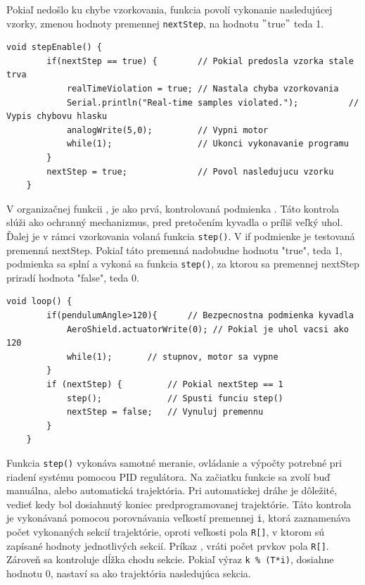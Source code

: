 Pokiaľ nedošlo ku chybe vzorkovania, funkcia povolí vykonanie nasledujúcej vzorky, zmenou hodnoty premennej \verb|nextStep|, na hodnotu $"$true$"$ teda 1. 

\begin{lstlisting}[caption={Funkcia stepEnable().},captionpos=b]
	void stepEnable() {                          
		if(nextStep == true) {        // Pokial predosla vzorka stale trva
			realTimeViolation = true; // Nastala chyba vzorkovania
			Serial.println("Real-time samples violated."); 			// Vypis chybovu hlasku
			analogWrite(5,0);         // Vypni motor 
			while(1);                 // Ukonci vykonavanie programu
		}
		nextStep = true;              // Povol nasledujucu vzorku
	}
\end{lstlisting}

V organizačnej funkcii , je ako prvá, kontrolovaná podmienka . Táto kontrola slúži ako ochranný mechanizmus, pred pretočením kyvadla o príliš veľký uhol. Ďalej je v rámci vzorkovania volaná funkcia \verb|step()|. V if podmienke je testovaná premenná nextStep. Pokiaľ táto premenná nadobudne hodnotu "true", teda 1, podmienka sa splní a vykoná sa funkcia \verb|step()|, za ktorou sa premennej nextStep priradí hodnota "false", teda 0.

\begin{lstlisting}[caption={Organzačná funkcia loop.},captionpos=b]
	void loop() {
		if(pendulumAngle>120){		// Bezpecnostna podmienka kyvadla 
			AeroShield.actuatorWrite(0); // Pokial je uhol vacsi ako 120
			while(1);		// stupnov, motor sa vypne
		} 
		if (nextStep) {         // Pokial nextStep == 1
			step();             // Spusti funciu step()
			nextStep = false;   // Vynuluj premennu 
		}
	}
\end{lstlisting}

Funkcia \verb|step()| vykonáva samotné meranie, ovládanie a výpočty potrebné pri riadení systému pomocou PID regulátora. Na začiatku funkcie sa zvolí buď manuálna, alebo automatická trajektória. Pri automatickej dráhe je dôležité, vedieť kedy bol dosiahnutý koniec predprogramovanej trajektórie. Táto kontrola je vykonávaná pomocou porovnávania veľkostí premennej \verb|i|, ktorá zaznamenáva počet vykonaných sekcií trajektórie, oproti veľkosti pola \verb|R[]|, v ktorom sú zapísané hodnoty jednotlivých sekcií. Príkaz , vráti počet prvkov pola \verb|R[]|. Zároveň sa kontroluje dĺžka chodu sekcie. Pokiaľ výraz \verb|k % (T*i)|, dosiahne hodnotu 0, nastaví sa ako trajektória nasledujúca sekcia. 

